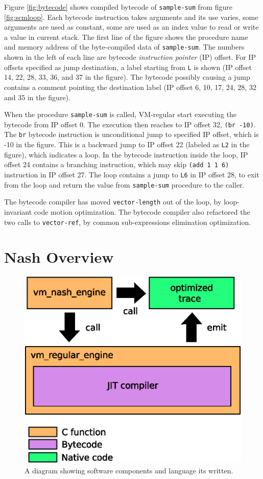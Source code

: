 \documentclass[preprint, numbers]{sigplanconf}
\begin{document}
Figure \hyperref[fig:bytecode]{\ref{fig:bytecode}} shows compiled bytecode of
\texttt{sample-sum} from figure
\hyperref[fig:scmloop]{\ref{fig:scmloop}}. Each bytecode instruction takes
arguments and its use varies, some arguments are used as constant, some are
used as an index value to read or write a value in current stack. The first
line of the figure shows the procedure name and memory address of the
byte-compiled data of \texttt{sample-sum}. The numbers shown in the left of
each line are bytecode \textit{instruction pointer} (IP) offset. For IP
offsets specified as jump destination, a label starting from \texttt{L} is
shown (IP offset 14, 22, 28, 33, 36, and 37 in the figure). The bytecode
possibly causing a jump contains a comment pointing the destination label (IP
offset 6, 10, 17, 24, 28, 32 and 35 in the figure).

When the procedure \texttt{sample-sum} is called, VM-regular start executing
the bytecode from IP offset 0. The execution then reaches to IP offset 32,
\texttt{(br -10)}. The \texttt{br} bytecode instruction is unconditional jump
to specified IP offset, which is -10 in the figure. This is a backward jump to
IP offset 22 (labeled as \texttt{L2} in the figure), which indicates a
loop. In the bytecode instruction inside the loop, IP offset 24 contains a
branching instruction, which may skip \texttt{(add 1 1 6)} instruction in IP
offset 27. The loop contains a jump to \texttt{L6} in IP offset 28, to exit
from the loop and return the value from \texttt{sample-sum} procedure to the
caller.

The bytecode compiler has moved \texttt{vector-length} out of the loop, by
loop-invariant code motion optimization. The bytecode compiler also refactored
the two calls to \texttt{vector-ref}, by common sub-expressions elimination
optimization.

\section{Nash Overview}
\label{sec:overview}


\begin{figure}
  \centering \includegraphics[width=0.4 \textwidth]{overview}
  \caption{A diagram showing software components and language its written.}
  \label{fig:overview}
\end{figure}
\end{document}
